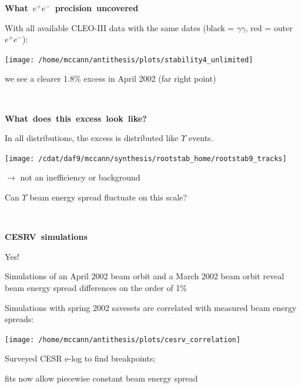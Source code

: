 \documentclass[landscape]{article}
\newenvironment{slide}[1][ ]{\mbox{\boldmath \bf #1 } \vfill}{\vfill \mbox{ } \pagebreak}
\begin{document}
\begin{slide}[What $e^+e^-$ precision uncovered]

With {\color{red} all available CLEO-III data} with the same dates (black = $\gamma\gamma$, {\color{red} red} = outer $e^+e^-$):

\vfill
\begin{center}
  \texttt{[image: /home/mccann/antithesis/plots/stability4\_unlimited]}
\end{center}

\vfill
we see a {\color{red} clearer} 1.8\% excess in April 2002 (far right point)

\vspace{-1 cm}

\end{slide}

\begin{slide}[What does this excess look like?]

In all distributions, the excess is distributed like $\Upsilon$
events.

\vfill
\begin{center}
  \texttt{[image: /cdat/daf9/mccann/synthesis/rootstab\_home/rootstab9\_tracks]}
\end{center}

$\rightarrow$ not an inefficiency or background

\vfill
Can $\Upsilon$ beam energy spread fluctuate on this scale?

\vspace{-1 cm}

\end{slide}

\begin{slide}[CESRV simulations]

Yes!

\vfill Simulations of an April 2002 beam orbit and a March 2002 beam
orbit reveal beam energy spread differences on the order of 1\%

\vfill Simulations with spring 2002 savesets are correlated with
measured beam energy spreads:

\vfill
\begin{center}
  \texttt{[image: /home/mccann/antithesis/plots/cesrv\_correlation]}
\end{center}

\vfill Surveyed CESR e-log to find breakpoints;

fits now allow piecewise constant beam energy spread

\vspace{-1 cm}

\end{slide}
\end{document}
